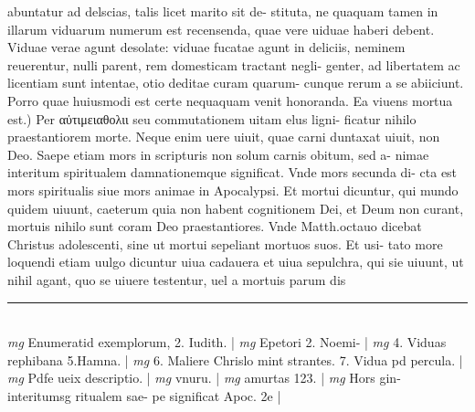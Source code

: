 \documentclass{article}
\begin{document}
\begin{pages}
abuntatur ad delscias, talis licet marito sit de- stituta, ne quaquam tamen in illarum viduarum numerum est recensenda, quae vere uiduae haberi debent. Viduae verae agunt desolate: viduae fucatae agunt in deliciis, neminem reuerentur, nulli parent, rem domesticam tractant negli- genter, ad libertatem ac licentiam sunt intentae, otio deditae curam quarum- cunque rerum a se abiiciunt. Porro quae huiusmodi est certe nequaquam venit honoranda.  \pend\pstart Ea viuens mortua est.) Per αὐτιμειαθολιι seu commutationem uitam elus ligni- ficatur nihilo praestantiorem morte. Neque enim uere uiuit, quae carni duntaxat uiuit, non Deo. Saepe etiam mors in scripturis non solum carnis obitum, sed a- nimae interitum spiritualem damnationemque significat. Vnde mors secunda di- cta est mors spiritualis siue mors animae in Apocalypsi. Et mortui dicuntur, qui mundo quidem uiuunt, caeterum quia non habent cognitionem Dei, et Deum non curant, mortuis nihilo sunt coram Deo praestantiores. Vnde Matth.octauo dicebat Christus adolescenti, sine ut mortui sepeliant mortuos suos. Et usi- tato more loquendi etiam uulgo dicuntur uiua cadauera et uiua sepulchra, qui sie uiuunt, ut nihil agant, quo se uiuere testentur, uel a mortuis parum dis  \pend
\vspace{0.5cm}\noindent
\vspace{0.2cm}\rule{1cm}{0.2pt}\\ 
\hspace{0.2cm}\textit{mg}
\footnotesize Enumeratid exemplorum, 2. Iudith. 
\normalsize| 
\hspace{0.2cm}\textit{mg}
\footnotesize Epetori 2. Noemi- 
\normalsize| 
\hspace{0.2cm}\textit{mg}
\footnotesize 4. Viduas rephibana 5.Hamna. 
\normalsize| 
\hspace{0.2cm}\textit{mg}
\footnotesize 6. Maliere Chrislo mint strantes. 7. Vidua pd percula. 
\normalsize| 
\hspace{0.2cm}\textit{mg}
\footnotesize Pdfe ueix descriptio. 
\normalsize| 
\hspace{0.2cm}\textit{mg}
\footnotesize vnuru. 
\normalsize| 
\hspace{0.2cm}\textit{mg}
\footnotesize amurtas 123. 
\normalsize| 
\hspace{0.2cm}\textit{mg}
\footnotesize Hors gin- interitumsg ritualem sae- pe significat Apoc. 2e 
\normalsize| 

\end{pages}
\end{document}
